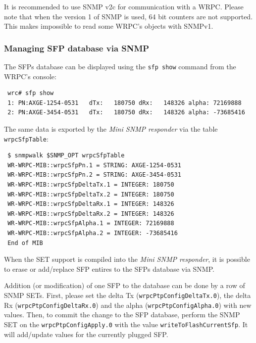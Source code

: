 \documentclass[a4paper, 12pt]{article}
\renewcommand{\_}{\underscore\allowbreak}
\begin{document}
It is recommended to use SNMP v2c for communication with a WRPC.
Please note that when the version 1 of SNMP is used, 64 bit counters are not
supported. This makes impossible to read some WRPC's objects with
SNMPv1.

\subsubsection{Managing SFP database via SNMP}
\label{Managing SFP database via SNMP}

The SFPs database can be displayed using the \texttt{sfp show} command from
the WRPC's console:
\begin{lstlisting}
 wrc# sfp show
 1: PN:AXGE-1254-0531   dTx:   180750 dRx:   148326 alpha: 72169888
 2: PN:AXGE-3454-0531   dTx:   180750 dRx:   148326 alpha: -73685416
\end{lstlisting}
The same data is exported by the \textit{Mini SNMP responder} via the table
\texttt{wrpcSfpTable}:

\begin{lstlisting}
 $ snmpwalk $SNMP_OPT wrpcSfpTable
 WR-WRPC-MIB::wrpcSfpPn.1 = STRING: AXGE-1254-0531
 WR-WRPC-MIB::wrpcSfpPn.2 = STRING: AXGE-3454-0531
 WR-WRPC-MIB::wrpcSfpDeltaTx.1 = INTEGER: 180750
 WR-WRPC-MIB::wrpcSfpDeltaTx.2 = INTEGER: 180750
 WR-WRPC-MIB::wrpcSfpDeltaRx.1 = INTEGER: 148326
 WR-WRPC-MIB::wrpcSfpDeltaRx.2 = INTEGER: 148326
 WR-WRPC-MIB::wrpcSfpAlpha.1 = INTEGER: 72169888
 WR-WRPC-MIB::wrpcSfpAlpha.2 = INTEGER: -73685416
 End of MIB
\end{lstlisting}
When the SET support is compiled into the \textit{Mini SNMP responder}, it is
possible to erase or add/replace SFP entires to the SFPs database via SNMP.\\

\begin{sloppypar} %
Addition (or modification) of one SFP to the database can be done by a row of
SNMP SETs. First, please set the delta Tx (\texttt{wrpcPtpConfigDeltaTx.0}), the
delta Rx (\texttt{wrpcPtpConfigDeltaRx.0}) and the alpha (\texttt{wrpcPtpConfigAlpha.0})
with new values. Then, to commit the change to the SFP database, perform the SNMP SET on
the \texttt{wrpcPtpConfigApply.0} with the value \texttt{writeToFlashCurrentSfp}. It will
add/update values for the currently plugged SFP.
\end{sloppypar}
\end{document}
